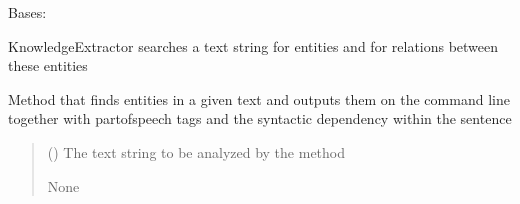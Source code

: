 \documentclass[letterpaper,10pt,english]{sphinxmanual}
\begin{document}
\begin{fulllineitems}
\label{\detokenize{medextractor.knowledge:medextractor.knowledge.knowledge_extractor.KnowledgeExtractor}}
\pysigstartsignatures
{}
\pysigstopsignatures
\sphinxAtStartPar
Bases: 

\sphinxAtStartPar
KnowledgeExtractor searches a text string for entities and for relations between these entities

\begin{fulllineitems}
\label{\detokenize{medextractor.knowledge:medextractor.knowledge.knowledge_extractor.KnowledgeExtractor.analyze_linguistically}}
\pysigstartsignatures
{}
\pysigstopsignatures
\sphinxAtStartPar
Method that finds entities in a given text and outputs them on the command line
together with part\sphinxhyphen{}of\sphinxhyphen{}speech tags and the syntactic dependency within the sentence
\begin{quote}\begin{description}
\sphinxAtStartPar
{} () \textendash{} The text string to be analyzed by the method

\sphinxAtStartPar
None

\end{description}\end{quote}

\end{fulllineitems}



\end{fulllineitems}
\end{document}
